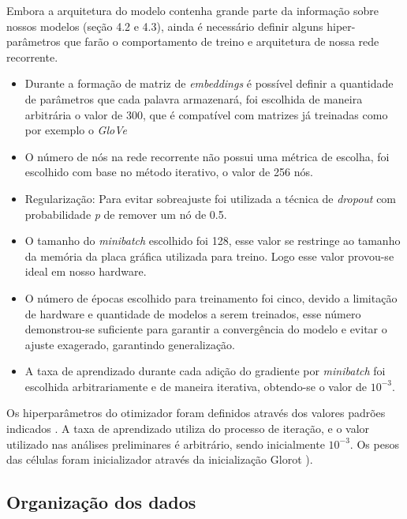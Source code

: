 \documentclass[12pt]{article}
\begin{document}
Embora a arquitetura do modelo contenha grande parte da informação sobre nossos modelos (seção 4.2 e 4.3), ainda é necessário definir alguns hiper-parâmetros que farão o comportamento de treino e arquitetura de nossa rede recorrente.

\begin{itemize}
  \item Durante a formação de matriz de \textit{embeddings} é possível definir a quantidade de parâmetros que cada palavra armazenará, foi escolhida de maneira arbitrária o valor de 300, que é compatível com matrizes já treinadas como por exemplo o \textit{GloVe} \cite{pennington2014glove}\\
  \item O número de nós na rede recorrente não possui uma métrica de escolha, foi escolhido com base no método iterativo, o valor de 256 nós.\\
  \item Regularização: Para evitar sobreajuste foi utilizada a técnica de \textit{dropout} com probabilidade \textit{p} de remover um nó de 0.5.\\
  \item O tamanho do \textit{minibatch} escolhido foi 128, esse valor se restringe ao tamanho da memória da placa gráfica utilizada para treino. Logo esse valor provou-se ideal em nosso hardware.\\
  \item O número de épocas escolhido para treinamento foi cinco, devido a limitação de hardware e quantidade de modelos a serem treinados, esse número demonstrou-se suficiente para garantir a convergência do modelo e evitar o ajuste exagerado, garantindo generalização.\\
  \item A taxa de aprendizado durante cada adição do gradiente por \textit{minibatch} foi escolhida arbitrariamente e de maneira iterativa, obtendo-se o valor de $10^{-3}$.
\end{itemize}

Os hiperparâmetros do otimizador foram definidos através dos valores padrões indicados \cite{DBLP:journals/corr/KingmaB14}. A taxa de aprendizado utiliza do processo de iteração, e o valor utilizado nas análises preliminares é arbitrário, sendo inicialmente $10^{-3}$. Os pesos das células foram inicializador através da inicialização Glorot \cite{glorot:10}).

\subsection{Organização dos dados}
\end{document}
